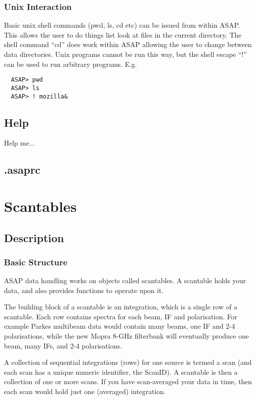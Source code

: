 \documentclass[11pt]{article}
\begin{document}
\subsubsection{Unix Interaction}

Basic unix shell commands (pwd, ls, cd etc) can be issued from within
ASAP. This allows the user to do things list look at files in the
current directory. The shell command ``cd'' does work within ASAP
allowing the user to change between data directories. Unix programs
cannot be run this way, but the shell escape ``$!$'' can be used to run
arbitrary programs. E.g.

\begin{verbatim}
  ASAP> pwd
  ASAP> ls
  ASAP> ! mozilla&
\end{verbatim}

\subsection{Help}

Help me...

\subsection{.asaprc}


\section{Scantables}

\subsection {Description}

\subsubsection {Basic Structure}

ASAP data handling works on objects called scantables.  A scantable
holds your data, and also provides functions to operate
upon it.

The building block of a scantable is an integration, which is a single
row of a scantable. Each row contains spectra for each beam, IF and
polarisation. For example Parkes multibeam data would contain many
beams, one IF and 2-4 polarisations, while the new Mopra 8-GHz
filterbank will eventually produce one beam, many IFs, and 2-4
polarisations.

A collection of sequential integrations (rows) for one source is termed
a scan (and each scan has a unique numeric identifier, the ScanID). A
scantable is then a collection  of one or more scans. If you have
scan-averaged your data in time, then each scan would  hold just one
(averaged) integration.
\end{document}
